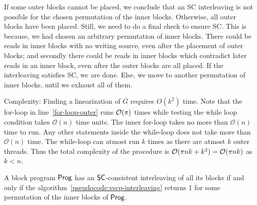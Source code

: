  If some outer blocks cannot be placed, we conclude that an SC interleaving is not possible for the chosen permutation of the inner blocks. Otherwise, all outer blocks have been placed. Still, we need to do a final check to ensure SC. This is because, we had chosen an arbitrary permutation of inner blocks. There could be reads in inner blocks with no writing source, even after the placement of outer blocks; and secondly there could be reads in inner blocks which contradict later reads in an inner block, even after the outer blocks are all placed. If the interleaving satisfies SC, we are done. Else, we move to another permutation of inner blocks, until we exhaust all of them.


Complexity: Finding a linearization of $G$ requires $O(k^2)$ time. Note that the for-loop in line~\ref{for-loop-outer} runs $\mathcal{O}(\pi)$ times while testing the while loop condition takes $\mathcal{O}(n)$ time units. The inner for-loop takes no more than $\mathcal{O}(n)$ time to run. Any other statements inside the while-loop does not take more than $\mathcal{O}(n)$ time. The while-loop can atmost run $k$ times as there are atmost $k$ outer  threads. Thus the total complexity of the procedure is  $\mathcal{O}(\pi nk+k^2)=\mathcal{O}(\pi nk)$ as $k<n$.  


\begin{theorem}
 A block program $\mathsf{Prog}$ has an $\mathsf{SC}$-consistent interleaving of all its blocks if and only if the  algorithm~\ref{pseudocode:vscp-interleaving} returns 1 for some permutation of the inner blocks of $\mathsf{Prog}$.
\end{theorem}

